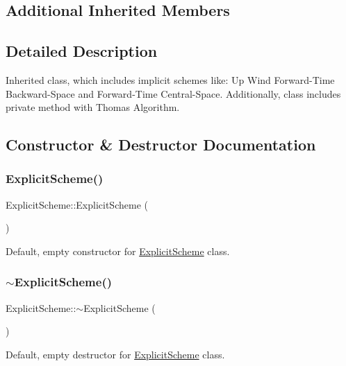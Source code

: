\subsection*{Additional Inherited Members}


\subsection{Detailed Description}
Inherited class, which includes implicit schemes like\+: Up Wind Forward-\/\+Time Backward-\/\+Space and Forward-\/\+Time Central-\/\+Space. Additionally, class includes private method with Thomas Algorithm. 

\subsection{Constructor \& Destructor Documentation}
\mbox{\label{class_explicit_scheme_ae63cfb8d333897b625dd17dc2acb4c46}} 
\subsubsection{\texorpdfstring{Explicit\+Scheme()}{ExplicitScheme()}}
{\footnotesize\ttfamily Explicit\+Scheme\+::\+Explicit\+Scheme (\begin{DoxyParamCaption}{ }\end{DoxyParamCaption})}

Default, empty constructor for \mbox{\hyperlink{class_explicit_scheme}{Explicit\+Scheme}} class. \mbox{\label{class_explicit_scheme_a5eee023f6f9d09609066a50dd620b49a}} 
\subsubsection{\texorpdfstring{$\sim$\+Explicit\+Scheme()}{~ExplicitScheme()}}
{\footnotesize\ttfamily Explicit\+Scheme\+::$\sim$\+Explicit\+Scheme (\begin{DoxyParamCaption}{ }\end{DoxyParamCaption})}

Default, empty destructor for \mbox{\hyperlink{class_explicit_scheme}{Explicit\+Scheme}} class. 

